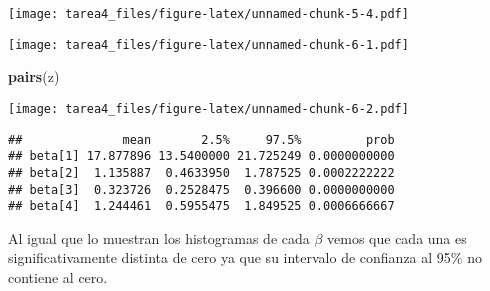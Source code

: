 \documentclass[]{article}
\newenvironment{Shaded}{\begin{snugshade}}{\end{snugshade}}
\newcommand{\KeywordTok}[1]{\textcolor[rgb]{0.13,0.29,0.53}{\textbf{#1}}}
\newcommand{\DataTypeTok}[1]{\textcolor[rgb]{0.13,0.29,0.53}{#1}}
\newcommand{\DecValTok}[1]{\textcolor[rgb]{0.00,0.00,0.81}{#1}}
\newcommand{\StringTok}[1]{\textcolor[rgb]{0.31,0.60,0.02}{#1}}
\newcommand{\CommentTok}[1]{\textcolor[rgb]{0.56,0.35,0.01}{\textit{#1}}}
\newcommand{\OperatorTok}[1]{\textcolor[rgb]{0.81,0.36,0.00}{\textbf{#1}}}
\newcommand{\NormalTok}[1]{#1}
\begin{document}
\texttt{[image: tarea4\_files/figure-latex/unnamed-chunk-5-4.pdf]}

\begin{Shaded}
\end{Shaded}

\texttt{[image: tarea4\_files/figure-latex/unnamed-chunk-6-1.pdf]}

\begin{Shaded}
\begin{Highlighting}[]
\KeywordTok{pairs}\NormalTok{(z)}
\end{Highlighting}
\end{Shaded}

\texttt{[image: tarea4\_files/figure-latex/unnamed-chunk-6-2.pdf]}

\begin{Shaded}
\end{Shaded}

\begin{verbatim}
##              mean       2.5%     97.5%         prob
## beta[1] 17.877896 13.5400000 21.725249 0.0000000000
## beta[2]  1.135887  0.4633950  1.787525 0.0002222222
## beta[3]  0.323726  0.2528475  0.396600 0.0000000000
## beta[4]  1.244461  0.5955475  1.849525 0.0006666667
\end{verbatim}

Al igual que lo muestran los histogramas de cada \(\beta\) vemos que
cada una es significativamente distinta de cero ya que su intervalo de
confianza al 95\% no contiene al cero.
\end{document}
